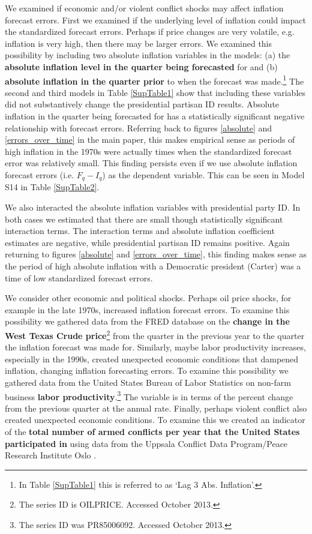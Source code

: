 \documentclass[a4paper]{article}
\begin{document}
We examined if economic and/or violent conflict shocks may affect inflation forecast errors. First we examined if the underlying level of inflation could impact the standardized forecast errors. Perhaps if price changes are very volatile, e.g. inflation is very high, then there may be larger errors. We examined this possibility by including two absolute inflation variables in the models: (a) the \textbf{absolute inflation level in the quarter being forecasted} for and (b) \textbf{absolute inflation in the quarter prior} to when the forecast was made.\footnote{In Table \ref{SupTable1} this is referred to as `Lag 3 Abs. Inflation'.} The second and third models in Table \ref{SupTable1} show that including these variables did not substantively change the presidential partisan ID results. Absolute inflation in the quarter being forecasted for has a statistically significant negative relationship with forecast errors. Referring back to figures \ref{absolute} and \ref{errors_over_time} in the main paper, this makes empirical sense as periods of high inflation in the 1970s were actually times when the standardized forecast error was relatively small. This finding persists even if we use absolute inflation forecast errors (i.e. $F_{q} - I_{q}$) as the dependent variable. This can be seen in Model S14 in Table \ref{SupTable2}.

We also interacted the absolute inflation variables with presidential party ID. In both cases we estimated that there are small though statistically significant interaction terms. The interaction terms and absolute inflation coefficient estimates are negative, while presidential partisan ID remains positive. Again returning to figures \ref{absolute} and \ref{errors_over_time}, this finding makes sense as the period of high absolute inflation with a Democratic president (Carter) was a time of low standardized forecast errors.

We consider other economic and political shocks. Perhaps oil price shocks, for example in the late 1970s, increased inflation forecast errors. To examine this possibility we gathered data from the FRED database on the \textbf{change in the West Texas Crude price}\footnote{The series ID is OILPRICE. Accessed October 2013.} from the quarter in the previous year to the quarter the inflation forecast was made for. Similarly, maybe labor productivity increases, especially in the 1990s, created unexpected economic conditions that dampened inflation, changing inflation forecasting errors. To examine this possibility we gathered data from the United States Bureau of Labor Statistics on non-farm business \textbf{labor productivity}.\footnote{The series ID was PR85006092. Accessed October 2013.} The variable is in terms of the percent change from the previous quarter at the annual rate. Finally, perhaps violent conflict also created unexpected economic conditions. To examine this we created an indicator of the \textbf{total number of armed conflicts per year that the United States participated in} using data from the Uppsala Conflict Data Program/Peace Research Institute Oslo \citep{Harbom2008,Themner2013}.
\end{document}
